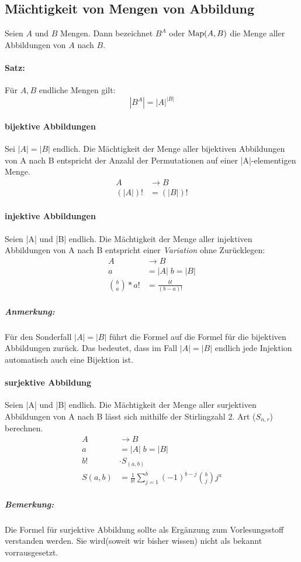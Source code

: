 \subsection{Mächtigkeit von Mengen von Abbildung}
Seien $A$ und $B$ Mengen.
Dann bezeichnet $B^A$ oder $\text{Map}(A,B)$ die Menge aller Abbildungen von $A$
nach $B$. \paragraph*{Satz:}
Für $A, B$ endliche Mengen gilt:
$$ |B^A| = {|A|}^{|B|} $$

\paragraph*{bijektive Abbildungen}
Sei $|A|=|B|$ endlich. Die Mächtigkeit der Menge aller bijektiven
Abbildungen von A nach B entspricht der Anzahl der Permutationen auf
einer |A|-elementigen Menge.
\begin{align*}
  A &\rightarrow B \\
  (|A|)! &= (|B|)!
\end{align*}

\paragraph*{injektive Abbildungen}
Seien |A| und |B| endlich. Die Mächtigkeit der Menge aller injektiven
Abbildungen von A nach B entspricht einer \emph{Variation} ohne Zurücklegen:
\begin{align*}
  A &\rightarrow B \\
  a &= |A| \; b = |B| \\
  {{b}\choose{a}} * a!
  &= \frac{b!}{(b-a)!}
\end{align*}

\subparagraph*{Anmerkung:} Für den Sonderfall $|A|=|B|$ führt die Formel auf die Formel für die bijektiven Abbildungen zurück. Das bedeutet, dass im Fall $|A|=|B|$ endlich jede Injektion
automatisch auch eine Bijektion ist.

\paragraph*{surjektive Abbildung}
Seien |A| und |B| endlich. Die Mächtigkeit der Menge aller surjektiven
Abbildungen von A nach B lässt sich mithilfe der
Stirlingzahl 2. Art ($S_{n,r}$) berechnen.
\begin{align*}
  A &\rightarrow B \\
  a &= |A| \; b = |B| \\
  b!    &\cdot S_{(a,b)}\\
  S(a,b)&=\frac{1}{b!}\sum_{j=1}^{b}(-1)^{b-j}{b \choose j}j^a
\end{align*}

\subparagraph*{Bemerkung:} Die Formel für surjektive Abbildung sollte als Ergänzung zum Vorlesungsstoff verstanden werden. 
Sie wird(soweit wir bisher wissen) nicht als bekannt vorrausgesetzt.